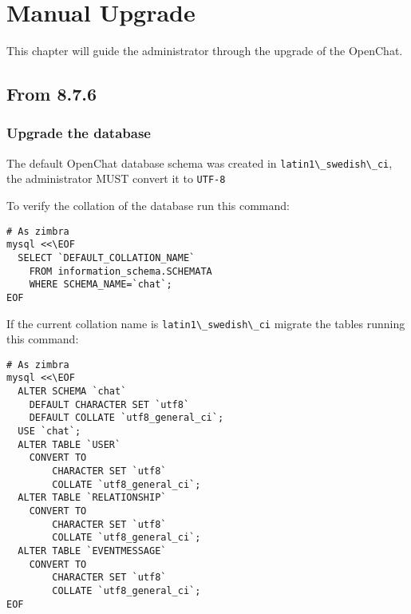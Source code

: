 \chapter{Manual Upgrade}

This chapter will guide the administrator through the upgrade of the OpenChat.

\section{From 8.7.6}
\subsection{Upgrade the database}
The default OpenChat database schema was created in \verb!latin1\_swedish\_ci!, the administrator MUST convert it to \verb!UTF-8!

To verify the collation of the database run this command:
\begin{verbatim}
# As zimbra
mysql <<\EOF
  SELECT `DEFAULT_COLLATION_NAME`
    FROM information_schema.SCHEMATA
    WHERE SCHEMA_NAME=`chat`;
EOF
\end{verbatim}
If the current collation name is \verb!latin1\_swedish\_ci! migrate the tables running this command:
\begin{verbatim}
# As zimbra
mysql <<\EOF
  ALTER SCHEMA `chat`
    DEFAULT CHARACTER SET `utf8`
    DEFAULT COLLATE `utf8_general_ci`;
  USE `chat`;
  ALTER TABLE `USER`
    CONVERT TO
        CHARACTER SET `utf8`
        COLLATE `utf8_general_ci`;
  ALTER TABLE `RELATIONSHIP`
    CONVERT TO
        CHARACTER SET `utf8`
        COLLATE `utf8_general_ci`;
  ALTER TABLE `EVENTMESSAGE`
    CONVERT TO
        CHARACTER SET `utf8`
        COLLATE `utf8_general_ci`;
EOF
\end{verbatim}
